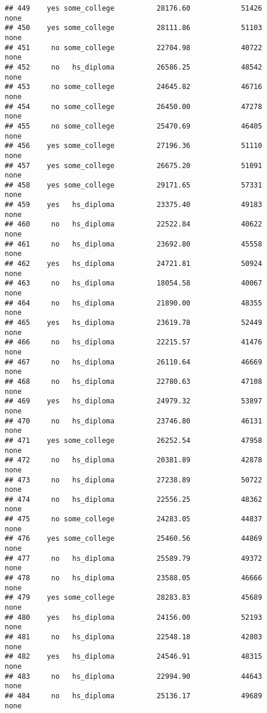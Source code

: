 \documentclass[
]{article}
\begin{document}
\begin{verbatim}
## 449    yes some_college          28176.60            51426        none
## 450    yes some_college          28111.86            51103        none
## 451     no some_college          22704.98            40722        none
## 452     no   hs_diploma          26586.25            48542        none
## 453     no some_college          24645.82            46716        none
## 454     no some_college          26450.00            47278        none
## 455     no some_college          25470.69            46405        none
## 456    yes some_college          27196.36            51110        none
## 457    yes some_college          26675.20            51091        none
## 458    yes some_college          29171.65            57331        none
## 459    yes   hs_diploma          23375.40            49183        none
## 460     no   hs_diploma          22522.84            40622        none
## 461     no   hs_diploma          23692.80            45558        none
## 462    yes   hs_diploma          24721.81            50924        none
## 463     no   hs_diploma          18054.58            40067        none
## 464     no   hs_diploma          21890.00            48355        none
## 465    yes   hs_diploma          23619.78            52449        none
## 466     no   hs_diploma          22215.57            41476        none
## 467     no   hs_diploma          26110.64            46669        none
## 468     no   hs_diploma          22780.63            47108        none
## 469    yes   hs_diploma          24979.32            53897        none
## 470     no   hs_diploma          23746.80            46131        none
## 471    yes some_college          26252.54            47958        none
## 472     no   hs_diploma          20381.89            42878        none
## 473     no   hs_diploma          27238.89            50722        none
## 474     no   hs_diploma          22556.25            48362        none
## 475     no some_college          24283.05            44837        none
## 476    yes some_college          25460.56            44869        none
## 477     no   hs_diploma          25589.79            49372        none
## 478     no   hs_diploma          23588.05            46666        none
## 479    yes some_college          28283.83            45689        none
## 480    yes   hs_diploma          24156.00            52193        none
## 481     no   hs_diploma          22548.18            42803        none
## 482    yes   hs_diploma          24546.91            48315        none
## 483     no   hs_diploma          22994.90            44643        none
## 484     no   hs_diploma          25136.17            49689        none

\end{verbatim}
\end{document}
